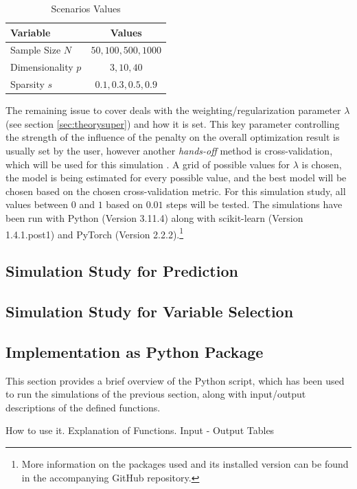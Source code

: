 \documentclass[12pt,a4paper]{article}
\newenvironment{lightbluebox}{%
    \begin{tcolorbox}[colback=lightblue, colframe=lightblue, fontupper=\itshape]%
}{%
    \end{tcolorbox}%
}
\begin{document}
\begin{table}[h!]
\begin{center}
\begin{tabular}{lc}\toprule
Variable & Values\\\midrule
Sample Size $N$ & $50, 100, 500, 1000$\\
Dimensionality $p$ & $3, 10, 40$\\
Sparsity $s$ & $0.1, 0.3, 0.5, 0.9$\\\bottomrule
\end{tabular}
\caption{Scenarios Values}
\label{tab:Scenarios}
\end{center}
\end{table}

The remaining issue to cover deals with the weighting/regularization parameter $\lambda$ (see section \ref{sec:theorysuper}) and how it is set. This key parameter controlling the strength of the influence of the penalty on the overall optimization result is usually set by the user, however another \textit{hands-off} method is cross-validation, which will be used for this simulation \parencite[250--251]{ESL2009}. A grid of possible values for $\lambda$ is chosen, the model is being estimated for every possible value, and the best model will be chosen based on the chosen cross-validation metric. For this simulation study, all values between $0$ and $1$ based on $0.01$ steps will be tested. The simulations have been run with Python (Version 3.11.4) along with scikit-learn (Version 1.4.1.post1) and PyTorch (Version 2.2.2).\footnote{More information on the packages used and its installed version can be found in the accompanying GitHub repository.}

\subsection{Simulation Study for Prediction} 

\subsection{Simulation Study for Variable Selection}


\subsection{Implementation as Python Package}

This section provides a brief overview of the Python script, which has been used to run the simulations of the previous section, along with input/output descriptions of the defined functions.
\begin{lightbluebox}
How to use it. 
Explanation of Functions. Input - Output Tables
\end{lightbluebox}
\end{document}
